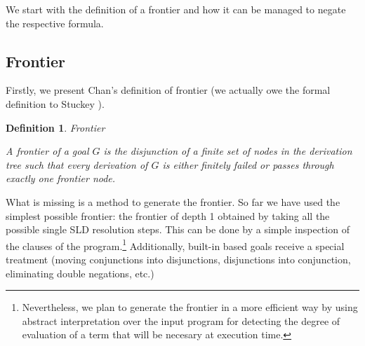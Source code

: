 \documentclass{tlp}
\newtheorem{definition}{Definition} %
\begin{document}
We start with the definition of a frontier and how it can be managed
to negate the respective formula.

\vspace{-0.1in}

\subsection{Frontier}
\label{frontier}

Firstly, we present Chan's definition of frontier (we actually owe the formal
definition to Stuckey \cite{Stuckey95}).

\begin{definition}{\em Frontier}

A frontier of a goal $G$ is the disjunction of a finite set of nodes
in the derivation tree such that every derivation of $G$ is either
finitely failed or passes through exactly one {\em frontier node}.
\end{definition}

What is missing is a method to generate the frontier. So far we have
used the simplest possible frontier: the frontier of depth 1 obtained
by taking all the possible single SLD resolution steps. This can be
done by a simple inspection of the clauses of the
program.\footnote{Nevertheless, we plan to generate the frontier in a
more efficient way by using abstract interpretation over the input
program for detecting the degree of evaluation of a term that will be
necesary at execution time.} Additionally, built-in based goals
receive a special treatment (moving conjunctions into disjunctions,
disjunctions into conjunction, eliminating double negations, etc.)
\end{document}
